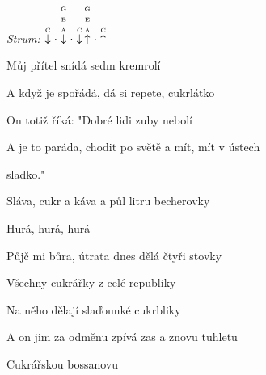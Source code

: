 \begin{song}


\begin{strumbox}
\textit{Strum:} $\PluckDown{C}\Miss\PluckDown{G \\ E \\ A}\Miss\PluckDown{C}\PluckUp{G \\ E \\ A}\Miss\PluckUp{C}$
\end{strumbox}

\begin{hchordbox}
\end{hchordbox}

\large

\bigskip

Můj přítel  snídá sedm kremrolí  \par
A když je spořádá, dá si repete, cukrlátko  \par
On totiž říká:  "Dobré lidi zuby nebolí  \par
A je to paráda, chodit po světě a mít, mít v ústech \par
{}sladko."    \par

\bigskip

\begin{chorusboxwide}{\Refren}
Sláva,  cukr a káva a půl litru becherovky \par
{}Hurá, hurá, hurá \par
Půjč mi bůra, útrata dnes dělá čtyři stovky \par
Všechny cukrářky z celé  republiky \par
Na něho dělají slaďounké cukrbliky \par
A on jim za odměnu zpívá zas a znovu tuhletu  \par
Cukrářskou bossanovu    \par
\end{chorusboxwide}

\bigskip


\end{song}
